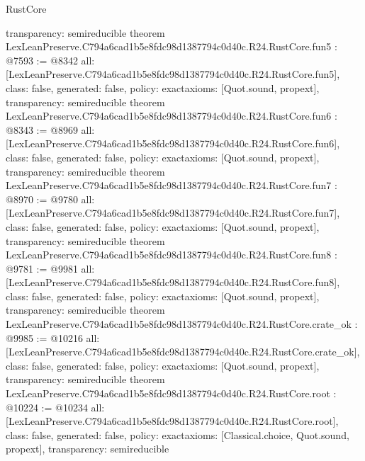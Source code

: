 \begin{lexlean}{RustCore}
\begin{coremodule}
{  transparency: semireducible
}
theorem LexLeanPreserve.C794a6cad1b5e8fdc98d1387794c0d40c.R24.RustCore.fun5 : @7593 := @8342 {
  all: [LexLeanPreserve.C794a6cad1b5e8fdc98d1387794c0d40c.R24.RustCore.fun5],
  class: false,
  generated: false,
  policy: exact{axioms: [Quot.sound, propext]},
  transparency: semireducible
}
theorem LexLeanPreserve.C794a6cad1b5e8fdc98d1387794c0d40c.R24.RustCore.fun6 : @8343 := @8969 {
  all: [LexLeanPreserve.C794a6cad1b5e8fdc98d1387794c0d40c.R24.RustCore.fun6],
  class: false,
  generated: false,
  policy: exact{axioms: [Quot.sound, propext]},
  transparency: semireducible
}
theorem LexLeanPreserve.C794a6cad1b5e8fdc98d1387794c0d40c.R24.RustCore.fun7 : @8970 := @9780 {
  all: [LexLeanPreserve.C794a6cad1b5e8fdc98d1387794c0d40c.R24.RustCore.fun7],
  class: false,
  generated: false,
  policy: exact{axioms: [Quot.sound, propext]},
  transparency: semireducible
}
theorem LexLeanPreserve.C794a6cad1b5e8fdc98d1387794c0d40c.R24.RustCore.fun8 : @9781 := @9981 {
  all: [LexLeanPreserve.C794a6cad1b5e8fdc98d1387794c0d40c.R24.RustCore.fun8],
  class: false,
  generated: false,
  policy: exact{axioms: [Quot.sound, propext]},
  transparency: semireducible
}
theorem LexLeanPreserve.C794a6cad1b5e8fdc98d1387794c0d40c.R24.RustCore.crate_ok : @9985 := @10216 {
  all: [LexLeanPreserve.C794a6cad1b5e8fdc98d1387794c0d40c.R24.RustCore.crate_ok],
  class: false,
  generated: false,
  policy: exact{axioms: [Quot.sound, propext]},
  transparency: semireducible
}
theorem LexLeanPreserve.C794a6cad1b5e8fdc98d1387794c0d40c.R24.RustCore.root : @10224 := @10234 {
  all: [LexLeanPreserve.C794a6cad1b5e8fdc98d1387794c0d40c.R24.RustCore.root],
  class: false,
  generated: false,
  policy: exact{axioms: [Classical.choice, Quot.sound, propext]},
  transparency: semireducible
}


\end{coremodule}
\end{lexlean}
